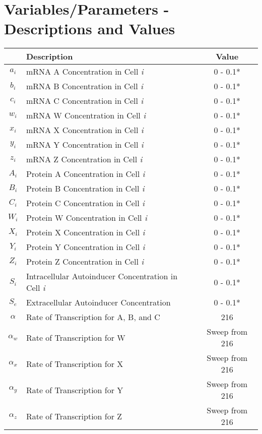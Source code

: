 \documentclass[fleqn]{article}
\begin{document}
\section*{Variables/Parameters - Descriptions and Values}
\begin{table}[h!]
\centering
\begin{tabular}{|c|l|c|}
\hline
\textbf{} & \textbf{Description} & \textbf{Value} \\
\hline
$a_i$ & mRNA A Concentration in Cell \textit{i} & 0 - 0.1* \\
$b_i$ & mRNA B Concentration in Cell \textit{i} & 0 - 0.1* \\
$c_i$ & mRNA C Concentration in Cell \textit{i} & 0 - 0.1* \\
$w_i$ & mRNA W Concentration in Cell \textit{i} & 0 - 0.1* \\
$x_i$ & mRNA X Concentration in Cell \textit{i} & 0 - 0.1* \\
$y_i$ & mRNA Y Concentration in Cell \textit{i} & 0 - 0.1* \\
$z_i$ & mRNA Z Concentration in Cell \textit{i} & 0 - 0.1* \\
$A_i$ & Protein A Concentration in Cell \textit{i} & 0 - 0.1* \\
$B_i$ & Protein B Concentration in Cell \textit{i} & 0 - 0.1* \\
$C_i$ & Protein C Concentration in Cell \textit{i} & 0 - 0.1* \\
$W_i$ & Protein W Concentration in Cell \textit{i} & 0 - 0.1* \\
$X_i$ & Protein X Concentration in Cell \textit{i} & 0 - 0.1* \\
$Y_i$ & Protein Y Concentration in Cell \textit{i} & 0 - 0.1* \\
$Z_i$ & Protein Z Concentration in Cell \textit{i} & 0 - 0.1* \\
$S_i$ & Intracellular Autoinducer Concentration in Cell \textit{i} & 0 - 0.1* \\
$S_e$ & Extracellular Autoinducer Concentration & 0 - 0.1* \\
$\alpha$ & Rate of Transcription for A, B, and C & 216 \\
$\alpha_w$ & Rate of Transcription for W & Sweep from 216 \\
$\alpha_x$ & Rate of Transcription for X & Sweep from 216 \\
$\alpha_y$ & Rate of Transcription for Y & Sweep from 216 \\
$\alpha_z$ & Rate of Transcription for Z & Sweep from 216 \\

\end{tabular}
\end{table}
\end{document}
